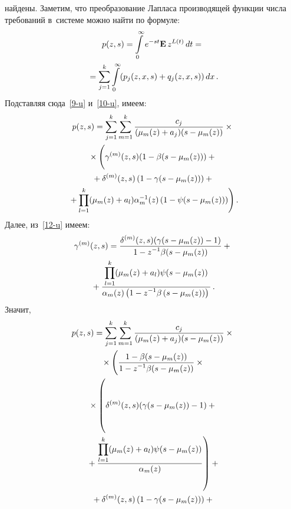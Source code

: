 \begin{multicols}{2}
найдены.
Заметим, что преобразование Лапласа производящей функции числа требований в~системе 
можно найти по формуле:
\begin{multline*}
p(z,s)=\int\limits_0^{\infty}e^{-st}
\mathbf E\, z^{L(t)}\,dt={}\\
{}=\sum\limits_{j=1}^k\int\limits_0^{\infty}(p_j(z,x,s)+q_j(z,x,s))\,dx\,.
\end{multline*}
Подставляя сюда~\eqref{9-u} и~\eqref{10-u}, имеем:
\begin{multline*}
p(z,s)=\sum\limits_{j=1}^k\sum\limits_{m=1}^k
\fr{c_j}{(\mu_m(z)+a_j)(s-\mu_m(z))}\times{}\\
{}\times
\left(
\vphantom{\prod\limits_{l=1}^k}
\gamma^{(m)}(z,s)(1-\beta(s-\mu_m(z)))+{}\right.\\
{}+\delta^{(m)}(z,s)\left(1-\gamma(s-\mu_m(z))\right)+{}\\
\left.{}+
\prod\limits_{l=1}^k(\mu_m(z)+a_l)\alpha_m^{-1}(z)
\left(1-\psi(s-\mu_m(z))\right)\right).
\end{multline*}
Далее, из~\eqref{12-u} имеем:
\begin{multline*}
\gamma^{(m)}(z,s)=\displaystyle\frac{\displaystyle \delta^{(m)}(z,s)(\gamma(s-\mu_m(z))-1)\mathstrut}{\displaystyle 1-z^{-1}\beta(s-\mu_m(z))\mathstrut}+{}\\
{}+
\displaystyle\frac{\displaystyle \prod\limits_{l=1}^k(\mu_m(z)+a_l)\psi(s-\mu_m(z))\mathstrut}{\displaystyle \alpha_m(z)
\left(1-z^{-1}\beta\left(s-\mu_m(z)\right)\right)\mathstrut}\,.
\end{multline*}
Значит,
\begin{multline*}
p(z,s)=\sum\limits_{j=1}^k\sum\limits_{m=1}^k\fr{c_j}{(\mu_m(z)+a_j)(s-\mu_m(z))}\times{}\\
{}\times
\Bigg(
\fr{1-\beta(s-\mu_m(z))}{1-z^{-1}\beta(s-\mu_m(z))}\times{}\\
{}\times\left(
\vphantom{\fr{\prod\limits_{l=1}^k(\mu_m(z)+a_l)\psi(s-\mu_m(z))}{\alpha_m(z)}}
\delta^{(m)}(z,s)(\gamma(s-\mu_m(z))-1)+{}\right.\\
\left.{}+
\fr{\prod\limits_{l=1}^k(\mu_m(z)+a_l)\psi(s-\mu_m(z))}{\alpha_m(z)}\right)+{}\\
{}+
\delta^{(m)}(z,s)\left(1-\gamma(s-\mu_m(z))\right)+{}
\end{multline*}


\end{multicols}
